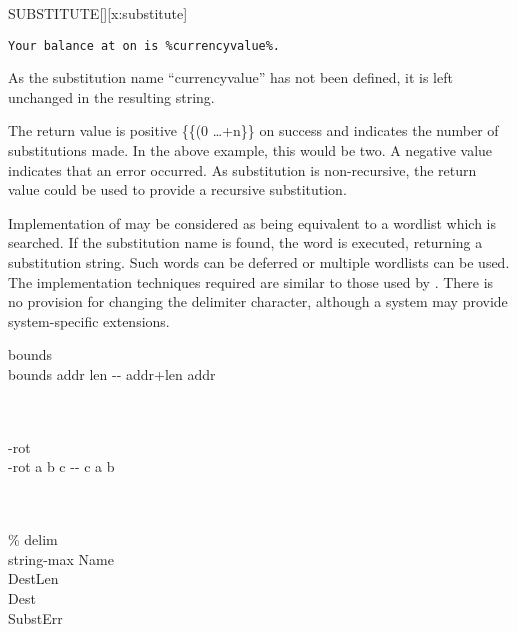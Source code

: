 \begin{worddef*}{}{SUBSTITUTE}[][x:substitute]
\begin{rationale}
		\begin{center}
			\texttt{Your balance at \ptime{} on \pdate{} is \%currencyvalue\%.}
		\end{center}

		As the substitution name ``currencyvalue'' has not been defined, it is
		left unchanged in the resulting string.

		The return value  is positive \{\{(0 \ldots +n\}\} on success
		and indicates the number of substitutions made.  In the above example,
		this would be two.  A negative value indicates that an error occurred.
		As substitution is non-recursive, the return value could be used to
		provide a recursive substitution.

		Implementation of  may be considered as being equivalent
		to a wordlist which is searched.  If the substitution name is found, the
		word is executed, returning a substitution string.
		Such words can be deferred or multiple wordlists can be used.
		The implementation techniques required are similar to those used by
		.
		There is no provision for changing the delimiter character, although a
		system may provide system-specific extensions.
	\end{rationale}

	\begin{implement}

		\word[tools]{[UNDEFINED]} bounds \word[tools]{[IF]} \\
		\tab \word{:} bounds \tab {} addr len -{}- addr+len addr \\
		\tab[2]  \word{+} \\
		\tab \word{;} \\
		\word[tools]{[THEN]}

		\word[tools]{[UNDEFINED]} -rot \word[tools]{[IF]} \\
		\tab \word{:} -rot \tab {} a b c -{}- c a b \\
		\tab[2] \word{ROT}  \\
		\tab \word{;} \\
		\word[tools]{[THEN]}

		 \%  delim 
		\tab[1.2]   \\
%
		string-max  Name	%
		\tab[0]   \\
%
		 DestLen %
		\tab[4.2]   \\
%
		 Dest %
		\tab[5.4]   \\
%
		 SubstErr %
		\tab[3.6]  


\end{implement}
\end{worddef*}
